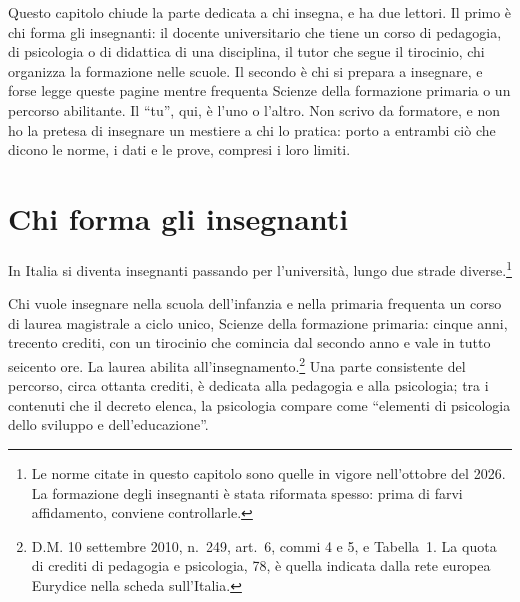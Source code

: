 Questo capitolo chiude la parte dedicata a chi insegna, e ha due
lettori. Il primo è chi forma gli insegnanti: il docente universitario
che tiene un corso di pedagogia, di psicologia o di didattica di una
disciplina, il tutor che segue il tirocinio, chi organizza la
formazione nelle scuole. Il secondo è chi si prepara a insegnare, e
forse legge queste pagine mentre frequenta Scienze della formazione
primaria o un percorso abilitante. Il \enquote{tu}, qui, è l'uno o
l'altro. Non scrivo da formatore, e non ho la pretesa di insegnare un
mestiere a chi lo pratica: porto a entrambi ciò che dicono le norme, i
dati e le prove, compresi i loro limiti.

\section{Chi forma gli insegnanti}

In Italia si diventa insegnanti passando per l'università, lungo due
strade diverse.\footnote{Le norme citate in questo capitolo sono
quelle in vigore nell'ottobre del 2026. La formazione degli insegnanti
è stata riformata spesso: prima di farvi affidamento, conviene
controllarle.}

Chi vuole insegnare nella scuola dell'infanzia e nella primaria
frequenta un corso di laurea magistrale a ciclo unico, Scienze della
formazione primaria: cinque anni, trecento crediti, con un tirocinio
che comincia dal secondo anno e vale in tutto seicento ore. La laurea
abilita all'insegnamento.\footnote{D.M. 10 settembre 2010, n.~249,
art.~6, commi 4 e 5, e Tabella~1. La quota di crediti di pedagogia e
psicologia, 78, è quella indicata dalla rete europea Eurydice nella
scheda sull'Italia.} Una parte consistente del percorso, circa
ottanta crediti, è dedicata alla pedagogia e alla psicologia; tra i
contenuti che il decreto elenca, la psicologia compare come
\enquote{elementi di psicologia dello sviluppo e dell'educazione}.

